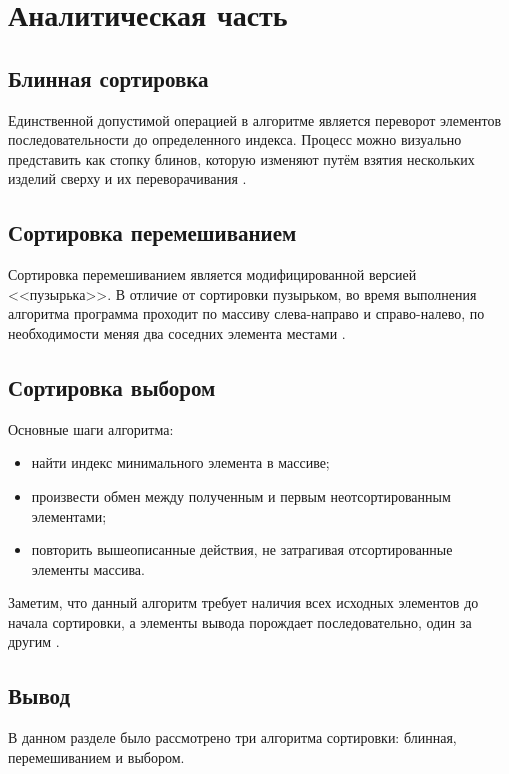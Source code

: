 \chapter{Аналитическая часть}

\section{Блинная сортировка}

Единственной допустимой операцией в алгоритме является переворот элементов последовательности до определенного индекса. Процесс можно визуально представить как стопку блинов, которую изменяют путём взятия нескольких изделий сверху и их переворачивания \cite{pancake_sort}.

\section{Сортировка перемешиванием}

Сортировка перемешиванием является модифицированной версией <<пузырька>>. В отличие от сортировки пузырьком, во время выполнения алгоритма программа проходит по массиву слева-направо и справо-налево, по необходимости меняя два соседних элемента местами \cite{cocktail_sort}.

\section{Сортировка выбором}

Основные шаги алгоритма:

\begin{itemize}
	\item найти индекс минимального элемента в массиве;
	\item произвести обмен между полученным и первым неотсортированным элементами;
	\item повторить вышеописанные действия, не затрагивая отсортированные элементы массива.
\end{itemize}

Заметим, что данный алгоритм требует наличия всех исходных элементов до начала сортировки, а элементы вывода порождает последовательно, один за другим \cite{selection_sort}.

\section*{Вывод}

В данном разделе было рассмотрено три алгоритма сортировки: блинная, перемешиванием и выбором.

\clearpage

